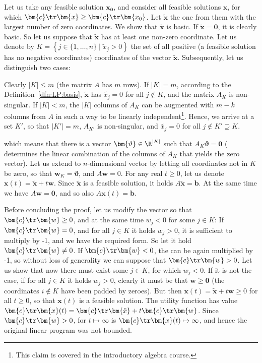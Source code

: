 \begin{dokaz}
  Let us take any feasible solution $\bm{x_0}$, and consider all 
  feasible solutions  $\bm{x}$, for which $\bm{c}\tr\bm{x}\ge\bm{c}\tr\bm{x_0}$.
  Let $\bm{\tilde{x}}$ the one from them with the largest number of zero coordinates.
  We show that $\bm{\tilde{x}}$ is basic. If  $\bm{\tilde{x}}=\bm{0}$,
  it is clearly basic. So let us suppose that  $\bm{\tilde{x}}$ has at least
  one non-zero coordinate. Let us denote by
  $K=\left\{j\in\{1,\ldots,n\}\mid\tilde{x}_j>0\right\}$
  the set of all positive (a feasible solution has no negative coordinates) coordinates
   of the vector $\bm{\tilde{x}}$. Subsequently, let us distinguish two cases:

 Clearly $|K|\le m$
(the matrix $A$ has $m$ rows). If $|K|=m$, 
according to the Definition~\ref{dfn:LP:basis}, $\bm{\tilde{x}}$ has $\tilde{x_j}=0$
for all $j\not\in K$, and the matrix $A_K$ is non-singular. 
If $|K|<m$, 
the $|K|$ columns of $A_K$ can be augmented with $m-k$ columns from $A$ in such a way to be
linearly independent\footnote{This claim is covered in the introductory algebra course.}.
Hence, we arrive at a set $K'$, so that $|K'|=m$, $A_{K'}$ is non-singular, and  $\tilde{x_j}=0$ 
for all
$j\not\in K'\supseteq K$.

which means that there is a vector
$\bm{\vartheta}\in\R^{|K|}$ such that $A_K\bm{\vartheta}=\bm{0}$
(\bm{\vartheta} 
determines the linear combination of the columns of $A_K$ that yields the
zero vector).
Let us extend \bm{\vartheta} to $n$-dimensional vector  
by letting all coordinates not in $K$ be zero, so that 
$\bm{w}_K=\bm{\vartheta}$, and
$A\bm{w}=0$.  For any real $t\ge0$, let us denote
$\bm{x}(t)=\bm{\tilde{x}}+t\bm{w}$.  Since $\bm{\tilde{x}}$ 
is a feasible solution, it holds
$A\bm{\tilde{x}}=\bm{b}$. At the same time we have $A\bm{w}=\bm{0}$, and so
also $A\bm{x}(t)=\bm{b}$.

Before concluding the proof, let us modify the vector  so that
$\bm{c}\tr\bm{w}\ge0$, and at the same time $w_j<0$ for some $j\in K$:
If $\bm{c}\tr\bm{w}=0$, and for all $j\in K$ it holds  $w_j>0$, 
it is sufficient to multiply 
by -1, and we have the required form. So let it hold
$\bm{c}\tr\bm{w}\not=0$.
If  $\bm{c}\tr\bm{w}<0$, the  
can be again multiplied by -1, so without loss of generality we can suppose
that 
$\bm{c}\tr\bm{w}>0$. 
Let us show that now there must exist some
$j\in K$, for which $w_j<0$.
If it is not the case, \ie if for all $j\in K$ it holds $w_j>0$,
clearly it must be that  $\bm{w}\ge\bm{0}$  (the coordinates
$i\not\in K$ have been padded by zeroes).
But then
$\bm{x}(t)=\bm{\tilde{x}}+t\bm{w}\ge0$ for all $t\ge0$, so that
$\bm{x}(t)$ is a feasible solution. The utility function has value
$\bm{c}\tr\bm{x}(t)=\bm{c}\tr\bm{\tilde{x}}+t\bm{c}\tr\bm{w}$. Since
$\bm{c}\tr\bm{w}>0$, for $t\mapsto\infty$ is $\bm{c}\tr\bm{x}(t)\mapsto\infty$,
and hence the original linear program was not bounded.


\end{dokaz}
